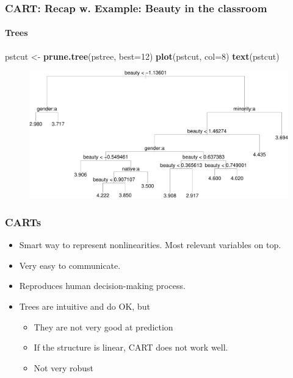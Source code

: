 \documentclass[
  shownotes,
  xcolor={svgnames},
  hyperref={colorlinks,citecolor=DarkBlue,linkcolor=DarkRed,urlcolor=DarkBlue}
  , aspectratio=169]{beamer}
\newenvironment{Shaded}{\begin{snugshade}}{\end{snugshade}}
\newcommand{\DataTypeTok}[1]{\textcolor[rgb]{0.13,0.29,0.53}{#1}}
\newcommand{\DecValTok}[1]{\textcolor[rgb]{0.00,0.00,0.81}{#1}}
\newcommand{\KeywordTok}[1]{\textcolor[rgb]{0.13,0.29,0.53}{\textbf{#1}}}
\newcommand{\NormalTok}[1]{#1}
\newcommand{\StringTok}[1]{\textcolor[rgb]{0.31,0.60,0.02}{#1}}
\begin{document}
\begin{frame}[fragile]
\frametitle{CART: Recap w. Example: Beauty in the classroom}
\framesubtitle{Trees}

\begin{scriptsize}
\begin{Shaded}
\begin{Highlighting}[]
\NormalTok{pstcut \textless{}{-}}\StringTok{ }\KeywordTok{prune.tree}\NormalTok{(pstree, }\DataTypeTok{best=}\DecValTok{12}\NormalTok{)}
\KeywordTok{plot}\NormalTok{(pstcut, }\DataTypeTok{col=}\DecValTok{8}\NormalTok{)}
\KeywordTok{text}\NormalTok{(pstcut)}
\end{Highlighting}
\end{Shaded}

\end{scriptsize}
\begin{figure}[H] \centering
            \captionsetup{justification=centering}
              \includegraphics[scale=0.4]{figures/unnamed-chunk-6-1.pdf}              
 \end{figure}


\end{frame}

\begin{frame}[fragile]
\frametitle{CARTs}

\begin{itemize}
  \item Smart way to represent nonlinearities. Most relevant variables on top.
  \medskip
  \item Very easy to communicate.
  \medskip
  \item  Reproduces human decision-making process.
  \medskip
  \item Trees are intuitive and do OK, but
  \begin{itemize}
    \item They are not very good at prediction 
  \item If the structure is linear, CART does not work well.
  \item  Not very robust
  \end{itemize}
  
\end{itemize}


\end{frame}
\end{document}
